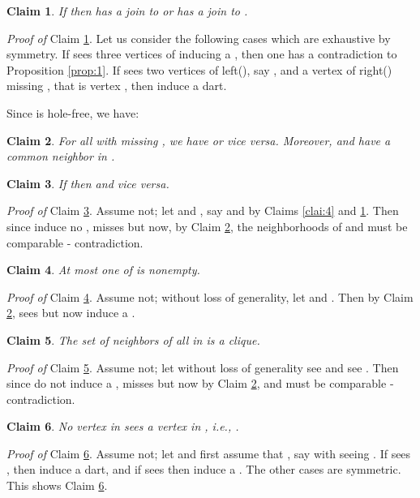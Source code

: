 \documentclass[11pt]{article}
\newcommand{\0}{\text{ has a co-join to }}
\newcommand{\1}{\text{ has a join to }}
\newtheorem{clai}{Claim}[section]
\begin{document}
\begin{clai}\label{clai:5}
If  then  has a join to  or  has a join to .
\end{clai}

\noindent
{\em Proof of} Claim \ref{clai:5}. Let us consider the following cases which are exhaustive by symmetry. If  sees three vertices of  inducing a , then one has a contradiction to Proposition \ref{prop:1}. If  sees two vertices of left(), say , and a vertex of right() missing , that is vertex , then  induce a dart. 


\medskip

Since  is hole-free, we have:

\begin{clai}\label{clai:7}
For all  with  missing , we have  or vice versa. Moreover,  and  have a common neighbor in .
\end{clai}

\begin{clai}\label{clai:8}
If  then  and vice versa.
\end{clai}

\noindent
{\em Proof of} Claim \ref{clai:8}. Assume not; let  and , say  and  by Claims \ref{clai:4} and \ref{clai:5}. Then since  induce no ,  misses  but now, by Claim \ref{clai:7}, the neighborhoods of  and  must be comparable - contradiction. 


\begin{clai}\label{clai:9}
At most one of  is nonempty.
\end{clai}

\noindent
{\em Proof of} Claim \ref{clai:9}. Assume not; without loss of generality, let  and . Then by Claim \ref{clai:7},  sees  but now  induce a . 


\begin{clai}\label{clai:10}
The set  of neighbors of all  in  is a clique.
\end{clai}

\noindent
{\em Proof of} Claim \ref{clai:10}. Assume not; let without loss of generality  see  and  see . Then since  do not induce a ,  misses  but now by Claim \ref{clai:7},  and  must be comparable - contradiction. 


\begin{clai}\label{clai:11}
No vertex in  sees a vertex in , i.e., .
\end{clai}

\noindent
{\em Proof of} Claim \ref{clai:11}. Assume not; let  and first assume that , say  with  seeing . If  sees , then  induce a dart, and if  sees  then  induce a . The other cases are symmetric. This shows Claim \ref{clai:11}. 
\end{document}
